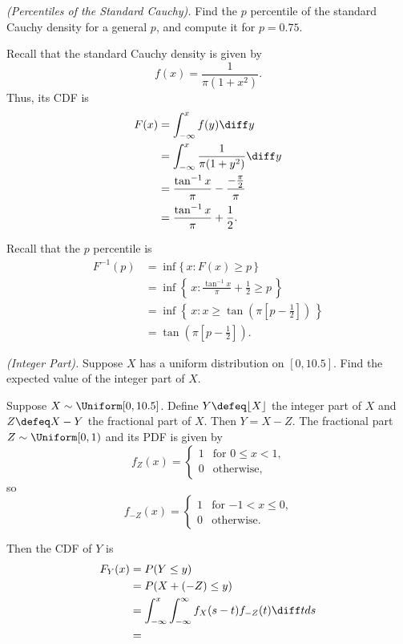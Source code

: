 \begin{problem}[Handout 12, \# 21]
  \emph{(Percentiles of the Standard Cauchy).} Find the \(p\)
  percentile of the standard Cauchy density for a general \(p\), and
  compute it for \(p=0.75\).
\end{problem}
\begin{solution}
  Recall that the standard Cauchy density is given by
  \[
    f(x)=\frac{1}{\pi(1+x^2)}.
  \]
  Thus, its CDF is
  \begin{align*}
    F(x)
    &=\int_{-\infty}^xf(y)\diff y\\
    &=\int_{-\infty}^x\frac{1}{\pi(1+y^2)}\diff y\\
    &=\frac{\tan^{-1}x}{\pi}-\frac{-\frac{\pi}{2}}{\pi}\\
    &=\frac{\tan^{-1}x}{\pi}+\frac{1}{2}.
  \end{align*}

  Recall that the \(p\) percentile is
  \begin{align*}
    F^{-1}(p)
    &=\inf\{\,x: F(x)\geq p\,\}\\
    &=\inf\left\{\,x:\frac{\tan^{-1}x}{\pi}+\frac{1}{2}\geq p\,\right\}\\
    &=\inf\left\{\,x:x\geq \tan\left(\pi\left[p-\frac{1}{2}\right]\right)\,\right\}\\
    &=\tan\left(\pi\left[p-\frac{1}{2}\right]\right).
  \end{align*}
\end{solution}
\newpage

\begin{problem}[Handout 12, \# 22]
  \emph{(Integer Part).} Suppose \(X\) has a uniform distribution on
  \([0,10.5]\). Find the expected value of the integer part of \(X\).
\end{problem}
\begin{solution}
  Suppose \(X\sim\Uniform[0,10.5]\). Define \(Y\defeq \lfloor X \rfloor\)
  the integer part of \(X\) and \(Z\defeq X-Y\) the fractional part of
  \(X\). Then \(Y=X-Z\). The fractional part \(Z\sim\Uniform[0,1)\) and its
  PDF is given by
  \[
    f_Z(x)=
    \begin{cases}
      1&\text{for \(0\leq x<1\),}\\
      0&\text{otherwise,}
    \end{cases}
  \]
  so
  \[
    f_{{-}Z}(x)=
    \begin{cases}
      1&\text{for \(-1<x\leq 0\),}\\
      0&\text{otherwise.}
    \end{cases}
  \]

  Then the CDF of \(Y\) is
  \begin{align*}
    F_Y(x)
    &=P(Y\leq y)\\
    &=P(X+({-}Z)\leq y)\\
    &=\int_{-\infty}^x\int_{-\infty}^\infty f_X(s-t)f_{{-}Z}(t)\diff t ds\\
    &=
  \end{align*}
\end{solution}
\newpage

